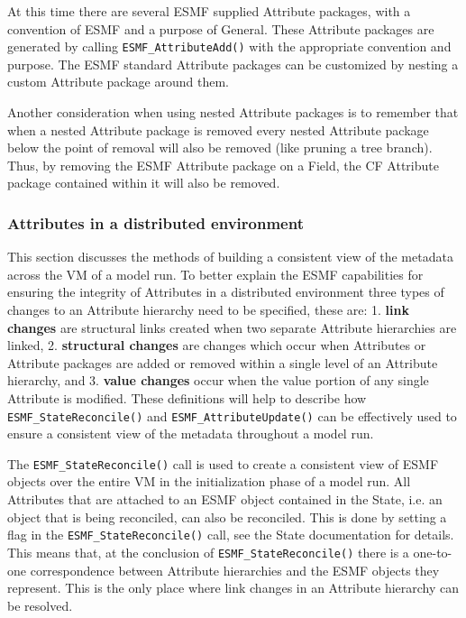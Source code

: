At this time there are several ESMF supplied Attribute packages, with a convention of ESMF and a purpose of General.  These Attribute packages are generated by calling {\tt ESMF\_AttributeAdd()} with the appropriate convention and purpose.  The ESMF standard Attribute packages can be customized by nesting a custom Attribute package around them.

Another consideration when using nested Attribute packages is to remember that when a nested Attribute package is removed every nested Attribute package below the point of removal will also be removed (like pruning a tree branch).  Thus, by removing the ESMF Attribute package on a Field, the CF Attribute package contained within it will also be removed.

\subsubsection{Attributes in a distributed environment}
\label{sec:Att:Dist}

This section discusses the methods of building a consistent view of the metadata across the VM of a model run.  To better explain the ESMF capabilities for ensuring the integrity of Attributes in a distributed environment three types of changes to an Attribute hierarchy need to be specified, these are: 1. {\bf link changes} are structural links created when two separate Attribute hierarchies are linked, 2. {\bf structural changes} are changes which occur when Attributes or Attribute packages are added or removed within a single level of an Attribute hierarchy, and 3. {\bf value changes} occur when the value portion of any single Attribute is modified.  These definitions will help to describe how {\tt ESMF\_StateReconcile()} and {\tt ESMF\_AttributeUpdate()} can be effectively used to ensure a consistent view of the metadata throughout a model run.

The {\tt ESMF\_StateReconcile()} call is used to create a consistent view of ESMF objects over the entire VM in the initialization phase of a model run.  All Attributes that are attached to an ESMF object contained in the State, i.e. an object that is being reconciled, can also be reconciled.  This is done by setting a flag in the {\tt ESMF\_StateReconcile()} call, see the State documentation for details.  This means that, at the conclusion of {\tt ESMF\_StateReconcile()} there is a one-to-one correspondence between Attribute hierarchies and the ESMF objects they represent.  This is the only place where link changes in an Attribute hierarchy can be resolved.


